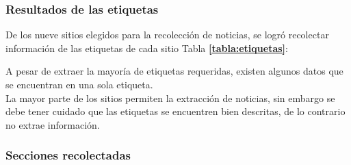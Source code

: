 \subsubsection{Resultados de las etiquetas}
De los nueve sitios elegidos para la recolección de noticias, se logró recolectar información de las etiquetas de cada sitio Tabla \textbf{\ref{tabla:etiquetas}}:
\\
\begin{table}[htbp]
  \centering
\end{table}

A pesar de extraer la mayoría de etiquetas requeridas, existen algunos datos que se encuentran en una sola etiqueta.
\\
La mayor parte de los sitios permiten la extracción de noticias, sin embargo se debe tener cuidado que las etiquetas se 
encuentren bien descritas, de lo contrario no extrae información.
\subsubsection{Secciones recolectadas}

